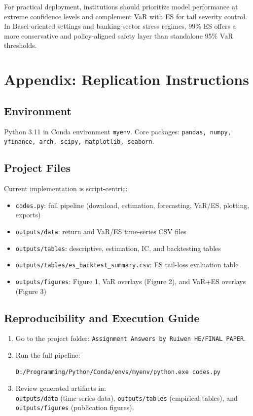 \documentclass[12pt]{article}
\begin{document}
For practical deployment, institutions should prioritize model performance at extreme confidence levels and complement VaR with ES for tail severity control. In Basel-oriented settings and banking-sector stress regimes, 99\% ES offers a more conservative and policy-aligned safety layer than standalone 95\% VaR thresholds.

\section{Appendix: Replication Instructions}
\subsection*{Environment}
Python 3.11 in Conda environment \texttt{myenv}. Core packages:
\texttt{pandas, numpy, yfinance, arch, scipy, matplotlib, seaborn}.

\subsection*{Project Files}
Current implementation is script-centric:
\begin{itemize}
    \item \texttt{codes.py}: full pipeline (download, estimation, forecasting, VaR/ES, plotting, exports)
    \item \texttt{outputs/data}: return and VaR/ES time-series CSV files
    \item \texttt{outputs/tables}: descriptive, estimation, IC, and backtesting tables
    \item \texttt{outputs/tables/es\_backtest\_summary.csv}: ES tail-loss evaluation table
    \item \texttt{outputs/figures}: Figure 1, VaR overlays (Figure 2), and VaR+ES overlays (Figure 3)
\end{itemize}

\subsection*{Reproducibility and Execution Guide}
\begin{enumerate}
    \item Go to the project folder: \texttt{Assignment Answers by Ruiwen HE/FINAL PAPER}.
    \item Run the full pipeline:
\begin{verbatim}
D:/Programming/Python/Conda/envs/myenv/python.exe codes.py
\end{verbatim}
    \item Review generated artifacts in:\\
    \texttt{outputs/data} (time-series data), \texttt{outputs/tables} (empirical tables), and \texttt{outputs/figures} (publication figures).
\end{enumerate}
\end{document}
